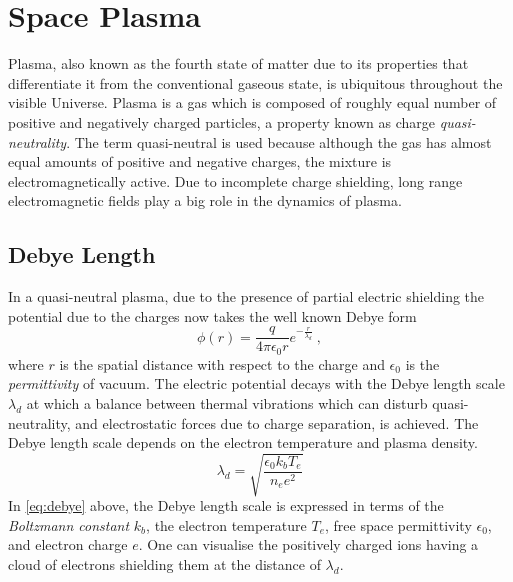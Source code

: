 \section{Space Plasma}\label{sec:plasma}

Plasma, also known as the fourth state of matter due to its properties that differentiate it 
from the conventional gaseous state, is ubiquitous throughout the visible Universe. Plasma is a gas 
which is composed of roughly equal number of positive and negatively charged particles, a property 
known as charge \emph{quasi-neutrality}. The term quasi-neutral is used because although the gas 
has almost equal amounts of positive and negative charges, the mixture is electromagnetically 
active. Due to incomplete charge shielding, long range electromagnetic fields play a big role in 
the dynamics of plasma.




\subsection*{Debye Length}

In a quasi-neutral plasma, due to the presence of partial electric shielding the potential due to 
the charges now takes the well known Debye form
%
\begin{equation}
    \phi(r) = \frac{q}{4\pi\epsilon_0 r} e^{-\frac{r}{\lambda_d}} \ , 
\end{equation} 
%
where $r$ is the spatial distance with respect to the charge and $\epsilon_0$ is the 
\emph{permittivity} of vacuum. The electric potential decays with the Debye length scale 
$\lambda_d$ at which a balance between thermal vibrations which can disturb quasi-neutrality, and 
electrostatic forces due to charge separation, is achieved. The Debye length scale depends on the 
electron temperature and plasma density.
%
\begin{equation}\label{eq:debye}
    \lambda_d = \sqrt{\frac{\epsilon_0 k_b T_e}{n_e e^2}}
\end{equation}
%
In \cref{eq:debye} above, the Debye length scale is expressed in terms of the 
\emph{Boltzmann constant} $k_b$, the electron temperature $T_e$, free space permittivity 
$\epsilon_0$, and electron charge $e$. One can visualise the positively charged ions having a cloud 
of electrons shielding them at the distance of $\lambda_d$. 

